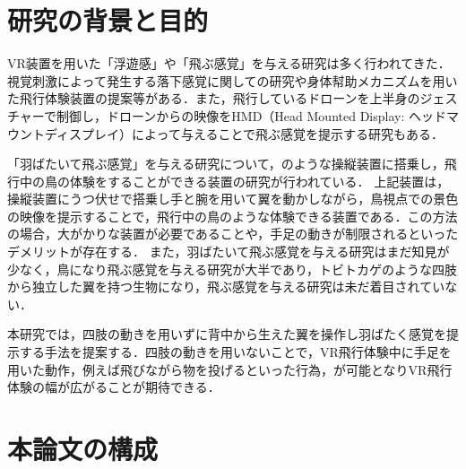 \section{研究の背景と目的}

        VR装置を用いた「浮遊感」や「飛ぶ感覚」を与える研究は多く行われてきた．視覚刺激によって発生する落下感覚に関しての研究\cite{bubka2008expanding}\cite{奥川夏輝2017VR空間における視覚刺激によって発生する落下感覚の分析}や身体幇助メカニズムを用いた飛行体験装置の提案\cite{鈴木拓馬2014hmd}等がある．また，飛行しているドローンを上半身のジェスチャーで制御し，ドローンからの映像をHMD（Head Mounted Display: ヘッドマウントディスプレイ）によって与えることで飛ぶ感覚を提示する研究\cite{piumsomboon2018superman}\cite{higuchi2013flying}\cite{rognon2018flyjacket}もある．


        「羽ばたいて飛ぶ感覚」を与える研究について，のような操縦装置に搭乗し，飛行中の鳥の体験をすることができる装置の研究が行われている\cite{rheiner2014birdly}\cite{hypersuit}．
        上記装置は，操縦装置にうつ伏せで搭乗し手と腕を用いて翼を動かしながら，鳥視点での景色の映像を提示することで，飛行中の鳥のような体験できる装置である．この方法の場合，大がかりな装置が必要であることや，手足の動きが制限されるといったデメリットが存在する．
        また，羽ばたいて飛ぶ感覚を与える研究はまだ知見が少なく，鳥になり飛ぶ感覚を与える研究が大半であり，トビトカゲのような四肢から独立した翼を持つ生物になり，飛ぶ感覚を与える研究は未だ着目されていない．

        本研究では，四肢の動きを用いずに背中から生えた翼を操作し羽ばたく感覚を提示する手法を提案する．四肢の動きを用いないことで，VR飛行体験中に手足を用いた動作，例えば飛びながら物を投げるといった行為，が可能となりVR飛行体験の幅が広がることが期待できる．

\section{本論文の構成}
        
